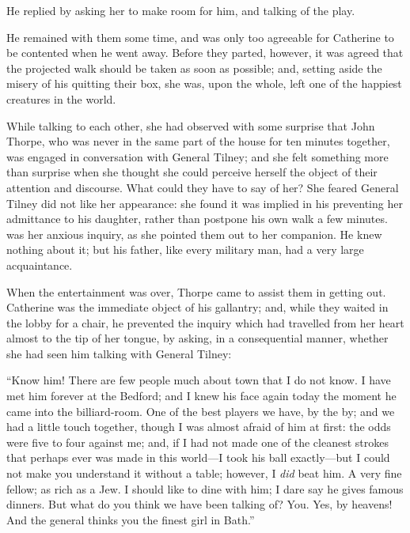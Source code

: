 
 He replied by asking her to make room for him, and talking of the play.

He remained with them some time, and was only too agreeable for Catherine to be contented when he went away. Before they parted, however, it was agreed that the projected walk should be taken as soon as possible; and, setting aside the misery of his quitting their box, she was, upon the whole, left one of the happiest creatures in the world.

While talking to each other, she had observed with some surprise that John Thorpe, who was never in the same part of the house for ten minutes together, was engaged in conversation with General Tilney; and she felt something more than surprise when she thought she could perceive herself the object of their attention and discourse. What could they have to say of her? She feared General Tilney did not like her appearance: she found it was implied in his preventing her admittance to his daughter, rather than postpone his own walk a few minutes.  was her anxious inquiry, as she pointed them out to her companion. He knew nothing about it; but his father, like every military man, had a very large acquaintance.

When the entertainment was over, Thorpe came to assist them in getting out. Catherine was the immediate object of his gallantry; and, while they waited in the lobby for a chair, he prevented the inquiry which had travelled from her heart almost to the tip of her tongue, by asking, in a consequential manner, whether she had seen him talking with General Tilney: 


“Know him! There are few people much about town that I do not know. I have met him forever at the Bedford; and I knew his face again today the moment he came into the billiard-room. One of the best players we have, by the by; and we had a little touch together, though I was almost afraid of him at first: the odds were five to four against me; and, if I had not made one of the cleanest strokes that perhaps ever was made in this world---I took his ball exactly---but I could not make you understand it without a table; however, I {\em did} beat him. A very fine fellow; as rich as a Jew. I should like to dine with him; I dare say he gives famous dinners. But what do you think we have been talking of? You. Yes, by heavens! And the general thinks you the finest girl in Bath.”


